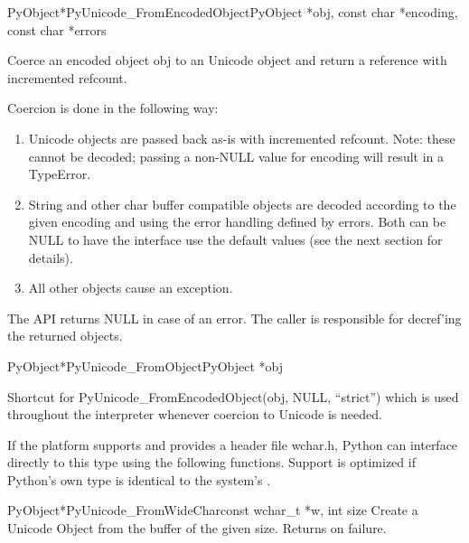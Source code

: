 \documentclass{manual}
\begin{document}
\begin{cfuncdesc}{PyObject*}{PyUnicode_FromEncodedObject}{PyObject *obj,
                                                      const char *encoding,
                                                      const char *errors}

Coerce an encoded object obj to an Unicode object and return a
reference with incremented refcount.

Coercion is done in the following way:
\begin{enumerate}
\item  Unicode objects are passed back as-is with incremented
      refcount. Note: these cannot be decoded; passing a non-NULL
      value for encoding will result in a TypeError.

\item String and other char buffer compatible objects are decoded
      according to the given encoding and using the error handling
      defined by errors. Both can be NULL to have the interface use
      the default values (see the next section for details).

\item All other objects cause an exception.
\end{enumerate}
The API returns NULL in case of an error. The caller is responsible
for decref'ing the returned objects.
\end{cfuncdesc}

\begin{cfuncdesc}{PyObject*}{PyUnicode_FromObject}{PyObject *obj}

Shortcut for PyUnicode_FromEncodedObject(obj, NULL, ``strict'')
which is used throughout the interpreter whenever coercion to
Unicode is needed.
\end{cfuncdesc}


If the platform supports  and provides a header file
wchar.h, Python can interface directly to this type using the
following functions. Support is optimized if Python's own
 type is identical to the system's .

\begin{cfuncdesc}{PyObject*}{PyUnicode_FromWideChar}{const wchar_t *w,
                                                     int size}
Create a Unicode Object from the  buffer  of the
given size. Returns \NULL{} on failure.
\end{cfuncdesc}
\end{document}
